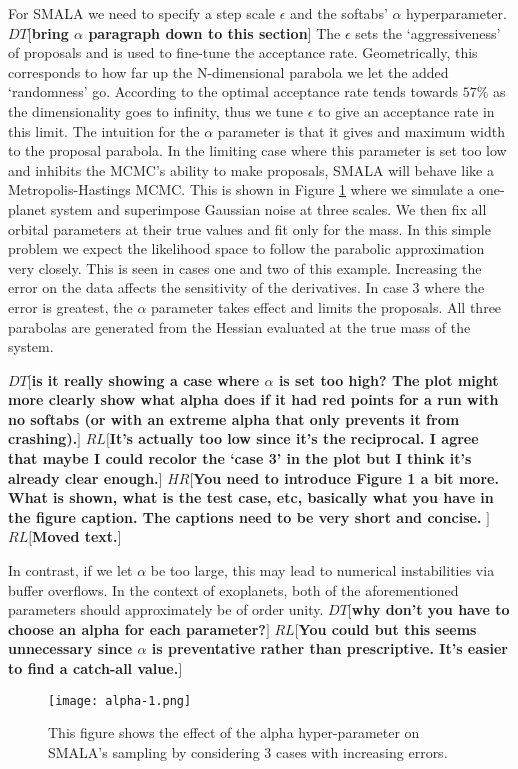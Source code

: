 \documentclass{aa}
\def\memohr#1{\color{blue}$HR[${\bf #1}$]$ \color{black}}
\def\memodt#1{\color{green}$DT[${\bf #1}$]$ \color{black}}
\def\memorl#1{\color{gray}$RL[${\bf #1}$]$ \color{black}}
\begin{document}
For SMALA we need to specify a step scale $\epsilon$ and the softabs' $\alpha$ hyperparameter. \memodt{bring $\alpha$ paragraph down to this section}
The $\epsilon$ sets the `aggressiveness' of proposals and is used to fine-tune the acceptance rate. 
Geometrically, this corresponds to how far up the N-dimensional parabola we let the added `randomness' go. 
According to \cite{robert1998} the optimal acceptance rate tends towards $57\%$ as the dimensionality goes to infinity, thus we tune $\epsilon$ to give an acceptance rate in this limit.
The intuition for the $\alpha$ parameter is that it gives and maximum width to the proposal parabola. 
In the limiting case where this parameter is set too low and inhibits the MCMC's ability to make proposals, SMALA will behave like a Metropolis-Hastings MCMC. 
This is shown in Figure \ref{alpha} where we simulate a one-planet system and superimpose Gaussian noise at three scales. We then fix all orbital parameters at their true values and fit only for the mass. In this simple problem we expect the likelihood space to follow the parabolic approximation very closely. 
This is seen in cases one and two of this example. 
Increasing the error on the data affects the sensitivity of the derivatives.
In case 3 where the error is greatest, the $\alpha$ parameter takes effect and limits the proposals. 
All three parabolas are generated from the Hessian evaluated at the true mass of the system.

\memodt{is it really showing a case where $\alpha$ is set too high? The plot might more clearly show what alpha does if it had red points for a run with no softabs (or with an extreme alpha that only prevents it from crashing).} 
\memorl{It's actually too low since it's the reciprocal. I agree that maybe I could recolor the `case 3' in the plot but I think it's already clear enough.}
\memohr{You need to introduce Figure 1 a bit more. What is shown, what is the test case, etc, basically what you have in the figure caption. The captions need to be very short and concise. }
\memorl{Moved text.}

In contrast, if we let $\alpha$ be too large, this may lead to numerical instabilities via buffer overflows. 
In the context of exoplanets, both of the aforementioned parameters should approximately be of order unity.
\memodt{why don't you have to choose an alpha for each parameter?}
\memorl{You could but this seems unnecessary since $\alpha$ is preventative rather than prescriptive. It's easier to find a catch-all value.}

\begin{figure}
\centering
\texttt{[image: alpha-1.png]}
   \caption{This figure shows the effect of the alpha hyper-parameter on SMALA's sampling by considering 3 cases with increasing errors. 
}
      \label{alpha}
\end{figure}
\end{document}
